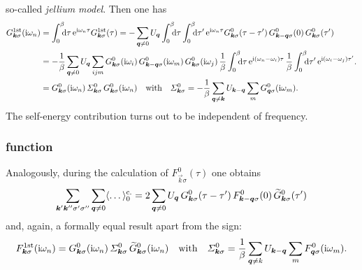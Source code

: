 so-called \emph{jellium model}. Then one has
%
\begin{align*}
    G \super{1st}_{\vec k \sigma}(\I \omega_n) &=
    \int \from 0 \till \beta \D \tau \, \E^{\I \omega_n \tau}
    G \super{1st}_{\vec k \sigma}(\tau)
    = -\sum_{\vec q \neq 0} U_{\vec q}
    \int \from 0 \till \beta \D \tau
    \int \from 0 \till \beta \D \tau' \,
    \E^{\I \omega_n \tau}
    G^0_{\vec k \sigma}(\tau - \tau') \,
    G^0_{\vec k - \vec q \sigma}(0) \,
    G^0_{\vec k \sigma}(\tau')
    \\
    &= -\frac 1 \beta \sum_{\vec q \neq 0} U_{\vec q} \sum_{i j m}
    G^0_{\vec k \sigma}(\I \omega_i) \,
    G^0_{\vec k - \vec q \sigma}(\I \omega_m) \,
    G^0_{\vec k \sigma}(\I \omega_j) \,
    \frac 1 \beta \int \from 0 \till \beta \D \tau \,
    \E^{\I (\omega_n - \omega_i) \tau} \,
    \frac 1 \beta \int \from 0 \till \beta \D \tau' \,
    \E^{\I (\omega_i - \omega_j) \tau'}.
    \\
    &= G^0_{\vec k \sigma}(\I \omega_n) \,
    \Sigma^0_{\vec k \sigma} \,
    G^0_{\vec k \sigma}(\I \omega_n)
    \quad \text{with} \quad
    \Sigma^0_{\vec k \sigma}
    = -\frac 1 \beta \sum_{\vec q \neq \vec k} U_{\vec k - \vec q}
    \sum_m G^0_{\vec q \sigma}(\I \omega_m).
\end{align*}
%
The self-energy contribution turns out to be independent of frequency.

\subsubsection{ function}

Analogously, during the calculation of $F^0_{\vec k \sigma}(\tau)$ one obtains
%
\begin{align*}
    \sum_{\boldsymbol k' \boldsymbol k'' \sigma' \sigma''} \sum_{\boldsymbol q \neq 0}
    \langle\dots\rangle_0 \sp{\text{c.}}
    = 2 \sum_{\boldsymbol q \neq 0} U_{\boldsymbol q} \,
    G^0_{\boldsymbol k \sigma}(\tau - \tau') \,
    F^0_{\boldsymbol k - \boldsymbol q \sigma}(0) \,
    \widetilde G^0_{\boldsymbol k \sigma}(\tau')
\end{align*}
%
and, again, a formally equal result apart from the sign:
%
\begin{equation*}
    F \sp{\text{1st}}_{\boldsymbol k \sigma}(\mathrm i \omega_n)
    = G^0_{\boldsymbol k \sigma}(\mathrm i \omega_n) \,
    \varSigma^0_{\boldsymbol k \sigma} \,
    \widetilde G^0_{\boldsymbol k \sigma}(\mathrm i \omega_n)
    \quad \text{with} \quad
    \varSigma^0_{\boldsymbol k \sigma}
    = \frac 1 \beta \sum_{\boldsymbol q \neq k} U_{\boldsymbol k - \boldsymbol q}
    \sum_m F^0_{\boldsymbol q \sigma}(\mathrm i \omega_m).
\end{equation*}

